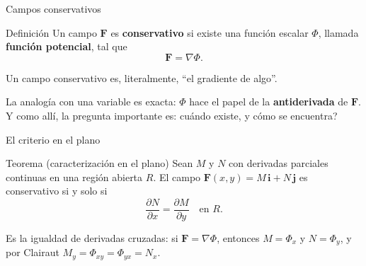 \documentclass[11pt,aspectratio=169]{beamer}
\begin{document}
\begin{frame}{Campos conservativos}
  \begin{block}{Definición}
    Un campo $\mathbf F$ es \textbf{conservativo} si existe una función escalar $\Phi$, llamada \textbf{función potencial}, tal que
    \[
      \mathbf F = \nabla \Phi.
    \]
  \end{block}
  \pause
  \vspace{4pt}
  \begin{center}
  \normalsize\color{tealx} Un campo conservativo es, literalmente, ``el gradiente de algo''.
  \end{center}
  \pause
  \vspace{8pt}
  \begin{center}\small\color{gray60}
  La analogía con una variable es exacta: $\Phi$ hace el papel de la \textbf{antiderivada} de $\mathbf F$.\\
  Y como allí, la pregunta importante es: \textquestiondown{}cuándo existe, y cómo se encuentra?
  \end{center}
\end{frame}

\begin{frame}{El criterio en el plano}
  \begin{block}{Teorema (caracterización en el plano)}
    Sean $M$ y $N$ con derivadas parciales continuas en una región abierta $R$. El campo $\mathbf F(x,y)=M\,\mathbf i+N\,\mathbf j$ es conservativo si y solo si
    \[
      \frac{\partial N}{\partial x} = \frac{\partial M}{\partial y}
      \quad\text{en } R.
    \]
  \end{block}
  \pause
  \vspace{4pt}
  \begin{center}\small\color{gray60}
  Es la igualdad de derivadas cruzadas: si $\mathbf F=\nabla\Phi$, entonces $M=\Phi_x$ y $N=\Phi_y$, y por Clairaut $M_y=\Phi_{xy}=\Phi_{yx}=N_x$.
  \end{center}
  \pause
\end{frame}
\end{document}
